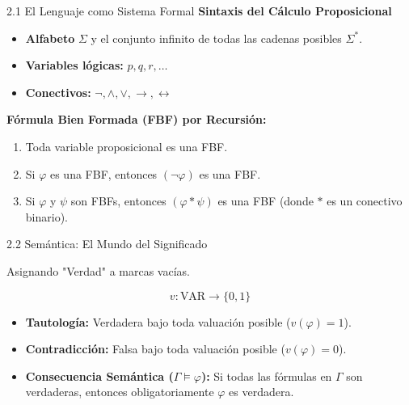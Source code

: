 \documentclass[10pt, aspectratio=169]{beamer}
\begin{document}
\begin{frame}{2.1 El Lenguaje como Sistema Formal}
    \textbf{Sintaxis del Cálculo Proposicional}
    
    \vspace{0.4cm}
    \begin{itemize}
        \item \textbf{Alfabeto} $\Sigma$ y el conjunto infinito de todas las cadenas posibles $\Sigma^*$.
        \item \textbf{Variables lógicas:} $p, q, r, \dots$
        \item \textbf{Conectivos:} $\neg, \land, \lor, \to, \leftrightarrow$
    \end{itemize}

    \vspace{0.6cm}
    \alert{\textbf{Fórmula Bien Formada (FBF) por Recursión:}}
    \begin{enumerate}
        \item Toda variable proposicional es una FBF.
        \item Si $\varphi$ es una FBF, entonces $(\neg\varphi)$ es una FBF.
        \item Si $\varphi$ y $\psi$ son FBFs, entonces $(\varphi * \psi)$ es una FBF (donde $*$ es un conectivo binario).
    \end{enumerate}
\end{frame}

\begin{frame}{2.2 Semántica: El Mundo del Significado}
    \begin{center}
        \Large Asignando "Verdad" a marcas vacías.
        
        \vspace{0.4cm}
        \begin{equation*}
            v: \text{VAR} \to \{0, 1\}
        \end{equation*}
        \normalsize
    \end{center}
    
    \vspace{0.4cm}
    \begin{itemize}
        \item \textbf{Tautología:} Verdadera bajo toda valuación posible ($v(\varphi) = 1$).
        \item \textbf{Contradicción:} Falsa bajo toda valuación posible ($v(\varphi) = 0$).
        \item \textbf{Consecuencia Semántica ($\Gamma \models \varphi$):} Si todas las fórmulas en $\Gamma$ son verdaderas, entonces obligatoriamente $\varphi$ es verdadera.
    \end{itemize}
\end{frame}
\end{document}
